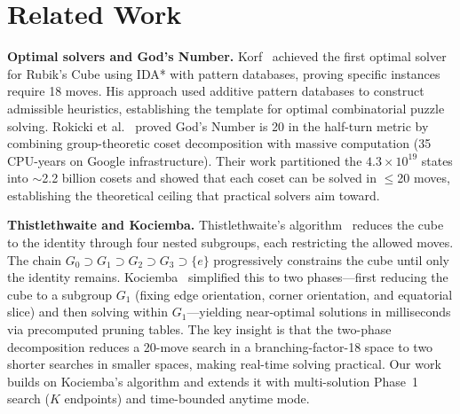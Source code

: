\documentclass[10pt,twocolumn,a4paper]{article}
\begin{document}
\section{Related Work}
\label{sec:related}

\textbf{Optimal solvers and God's Number.}
Korf~\cite{korf1997} achieved the first optimal solver for Rubik's Cube using IDA* with pattern databases, proving specific instances require 18 moves. His approach used additive pattern databases to construct admissible heuristics, establishing the template for optimal combinatorial puzzle solving. Rokicki et al.~\cite{godnumber} proved God's Number is 20 in the half-turn metric by combining group-theoretic coset decomposition with massive computation (35 CPU-years on Google infrastructure). Their work partitioned the $4.3 \times 10^{19}$ states into $\sim$2.2 billion cosets and showed that each coset can be solved in $\leq$20 moves, establishing the theoretical ceiling that practical solvers aim toward.

\textbf{Thistlethwaite and Kociemba.}
Thistlethwaite's algorithm~\cite{thistlethwaite1981} reduces the cube to the identity through four nested subgroups, each restricting the allowed moves. The chain $G_0 \supset G_1 \supset G_2 \supset G_3 \supset \{e\}$ progressively constrains the cube until only the identity remains. Kociemba~\cite{kociemba} simplified this to two phases---first reducing the cube to a subgroup $G_1$ (fixing edge orientation, corner orientation, and equatorial slice) and then solving within $G_1$---yielding near-optimal solutions in milliseconds via precomputed pruning tables. The key insight is that the two-phase decomposition reduces a 20-move search in a branching-factor-18 space to two shorter searches in smaller spaces, making real-time solving practical. Our work builds on Kociemba's algorithm and extends it with multi-solution Phase~1 search ($K$ endpoints) and time-bounded anytime mode.
\end{document}
